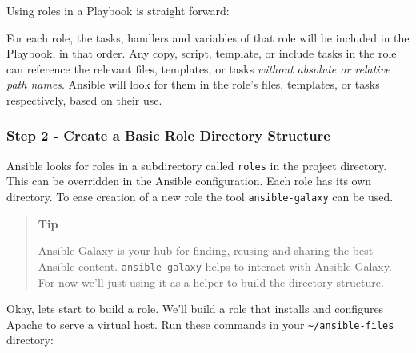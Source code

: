 Using roles in a Playbook is straight forward:

\begin{Shaded}
\begin{Highlighting}[]
\PreprocessorTok{{-}{-}{-}}
\KeywordTok{{-}}\AttributeTok{ }\KeywordTok{:}
\AttributeTok{  }\KeywordTok{:}
\AttributeTok{  }\KeywordTok{:}
\AttributeTok{    }\KeywordTok{{-}}
\AttributeTok{    }\KeywordTok{{-}}
\end{Highlighting}
\end{Shaded}

For each role, the tasks, handlers and variables of that role will be
included in the Playbook, in that order. Any copy, script, template, or
include tasks in the role can reference the relevant files, templates,
or tasks \emph{without absolute or relative path names}. Ansible will
look for them in the role's files, templates, or tasks respectively,
based on their use.

\hypertarget{step-2---create-a-basic-role-directory-structure}{%
\subsubsection{Step 2 - Create a Basic Role Directory
Structure}\label{step-2---create-a-basic-role-directory-structure}}

Ansible looks for roles in a subdirectory called \texttt{roles} in the
project directory. This can be overridden in the Ansible configuration.
Each role has its own directory. To ease creation of a new role the tool
\texttt{ansible-galaxy} can be used.

\begin{quote}
\textbf{Tip}

Ansible Galaxy is your hub for finding, reusing and sharing the best
Ansible content. \texttt{ansible-galaxy} helps to interact with Ansible
Galaxy. For now we'll just using it as a helper to build the directory
structure.
\end{quote}

Okay, lets start to build a role. We'll build a role that installs and
configures Apache to serve a virtual host. Run these commands in your
\texttt{\textasciitilde{}/ansible-files} directory:

\begin{Shaded}
\begin{Highlighting}[]
\ExtensionTok{[student@controller}\NormalTok{ ansible{-}files]$ mkdir roles}
\ExtensionTok{[student@controller}\NormalTok{ ansible{-}files]$ ansible{-}galaxy init }
\end{Highlighting}
\end{Shaded}

